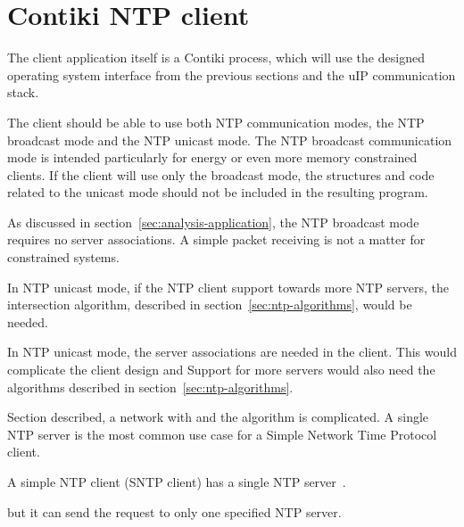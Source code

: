 
\section{Contiki NTP client}\label{sec:design-client}
The client application itself is a Contiki process,
which will use the designed operating system interface from the previous sections
and the uIP communication stack.

The client should be able to use both NTP communication modes,
the NTP broadcast mode and the NTP unicast mode.
The NTP broadcast communication mode is intended particularly for energy or
even more memory constrained clients.
If the client will use only the broadcast mode, the structures and code
related to the unicast mode should not be included in the resulting program.


As discussed in section~\ref{sec:analysis-application}, the NTP broadcast mode requires no server
associations.
A simple packet receiving is not a matter for constrained systems.


In NTP unicast mode, if the NTP client support towards more NTP servers,
the intersection algorithm, described in section~\ref{sec:ntp-algorithms}, would be needed.

In NTP unicast mode, the server associations are needed in the client.
This would complicate the client design and 
Support for more servers would also need the algorithms described in section~\ref{sec:ntp-algorithms}.

Section described, a network with
and the algorithm is complicated.
A single NTP server is the most common use case for a Simple Network Time Protocol client.

A simple NTP client (SNTP client) has a single NTP server~\cite{rfc5905}.


but it can send the request to only one specified NTP server.







